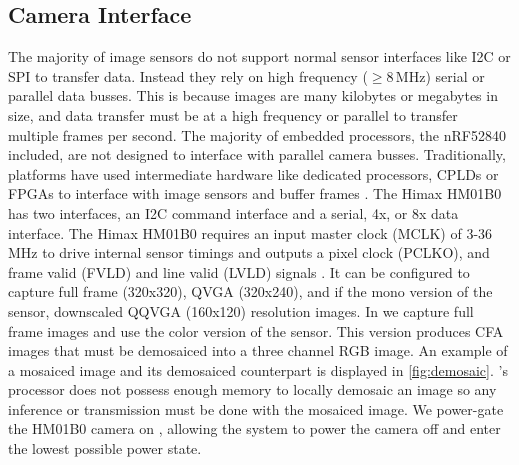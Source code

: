 \subsection{Camera Interface}
The majority of image sensors do not support normal sensor interfaces like I2C or SPI to transfer data. Instead they rely on high frequency ($\geq$8\,MHz) serial or parallel data busses. This is because images are many kilobytes or megabytes in size, and data transfer must be at a high frequency or parallel to transfer multiple frames per second. The majority of embedded processors, the nRF52840 included, are not designed to interface with parallel camera busses. Traditionally, platforms have used intermediate hardware like dedicated processors, CPLDs or FPGAs to interface with image sensors and buffer frames \cite{rowe2007firefly,rahimi2005cyclops}. The Himax HM01B0 has two interfaces, an I2C command interface and a serial, 4x, or 8x data interface.
The Himax HM01B0 requires an input master clock (MCLK) of 3-36\,MHz to drive internal sensor timings and outputs a pixel clock (PCLKO), and frame valid (FVLD) and line valid (LVLD) signals \cite{hm01b0}. It can be configured to capture full frame (320x320), QVGA (320x240), and if the mono version of the sensor, downscaled QQVGA (160x120) resolution images. In \namec{} we capture full frame images and use the color version of the sensor. This version produces CFA images that must be demosaiced into a three channel RGB image. An example of a mosaiced image and its demosaiced counterpart is displayed in \cref{fig:demosaic}. \namec{}'s processor does not possess enough memory to locally demosaic an image so any inference or transmission must be done with the mosaiced image. We power-gate the HM01B0 camera on \namec, allowing the system to power the camera off and enter the lowest possible power state.


